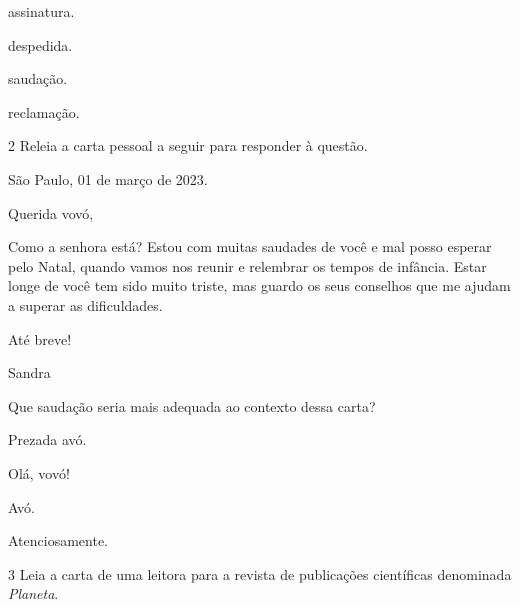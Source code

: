 \begin{multicols}{2}
\begin{escolha}
\item assinatura.

\item despedida.

\item saudação.

\item reclamação.
\end{escolha}
\end{multicols}

\num{2} Releia a carta pessoal a seguir para responder à questão.


\begin{mdframed}[linewidth=10pt,linecolor=salmao!20,backgroundcolor=salmao!20,roundcorner=20pt]
\begin{flushright}
São Paulo, 01 de março de 2023.
\end{flushright}

Querida vovó,

Como a senhora está? Estou com muitas saudades de você e mal posso
esperar pelo Natal, quando vamos nos reunir e relembrar os tempos de
infância. Estar longe de você tem sido muito triste, mas guardo os seus
conselhos que me ajudam a superar as dificuldades.

\begin{flushright}
Até breve!

Sandra
\end{flushright}
\end{mdframed}

\pagebreak
Que saudação seria mais adequada ao contexto dessa carta?

\begin{multicols}{2}
\begin{escolha}
\item Prezada avó.

\item Olá, vovó!

\item Avó.

\item Atenciosamente.
\end{escolha}
\end{multicols}



\num{3} Leia a carta de uma leitora para a revista de publicações
científicas denominada \textit{Planeta}.


